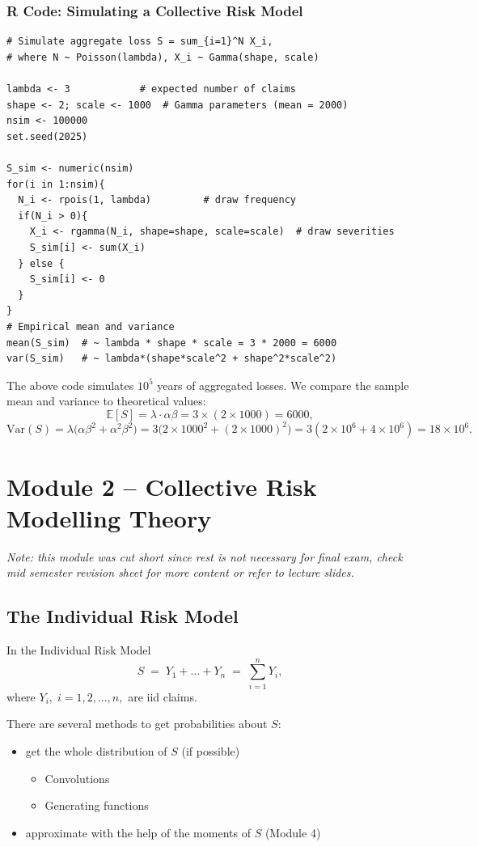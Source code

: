 \documentclass[11pt]{article}
\newcommand{\noi}{\noindent}
\begin{document}
\subsubsection*{R Code: Simulating a Collective Risk Model}
\begin{lstlisting}
# Simulate aggregate loss S = sum_{i=1}^N X_i, 
# where N ~ Poisson(lambda), X_i ~ Gamma(shape, scale)

lambda <- 3            # expected number of claims
shape <- 2; scale <- 1000  # Gamma parameters (mean = 2000)
nsim <- 100000
set.seed(2025)

S_sim <- numeric(nsim)
for(i in 1:nsim){
  N_i <- rpois(1, lambda)         # draw frequency
  if(N_i > 0){
    X_i <- rgamma(N_i, shape=shape, scale=scale)  # draw severities
    S_sim[i] <- sum(X_i)
  } else {
    S_sim[i] <- 0
  }
}
# Empirical mean and variance
mean(S_sim)  # ~ lambda * shape * scale = 3 * 2000 = 6000
var(S_sim)   # ~ lambda*(shape*scale^2 + shape^2*scale^2) 
\end{lstlisting}
\noindent \noindent The above code simulates \(10^5\) years of aggregated losses. We compare the sample mean and variance to theoretical values:
\[
\mathbb{E}[S] = \lambda \cdot \alpha\beta = 3 \times (2 \times 1000) = 6000,
\]
\[
\mathrm{Var}(S) = \lambda\big(\alpha\beta^2 + \alpha^2 \beta^2\big) 
= 3\big(2\times1000^2 + (2\times1000)^2\big) = 3(2\times10^6 + 4\times10^6) = 18\times10^6.
\]
\newpage
\section{Module 2 – Collective Risk Modelling Theory}

\noi \textit{Note: this module was cut short since rest is not necessary for final exam, check mid semester revision sheet for more content or refer to lecture slides.}

\subsection{The Individual Risk Model}

\noi In the Individual Risk Model
\[
S \;=\; Y_{1} + \dots + Y_{n} \;=\; \sum_{i=1}^{n} Y_{i},
\]
\noi where \(Y_i,\;i=1,2,\dots,n,\) are iid claims.

\noi There are several methods to get probabilities about \(S\):
\begin{itemize}
  \item get the whole distribution of \(S\) (if possible)
    \begin{itemize}
      \item Convolutions
      \item Generating functions
    \end{itemize}
  \item approximate with the help of the moments of \(S\) (Module 4)
\end{itemize}
\end{document}
